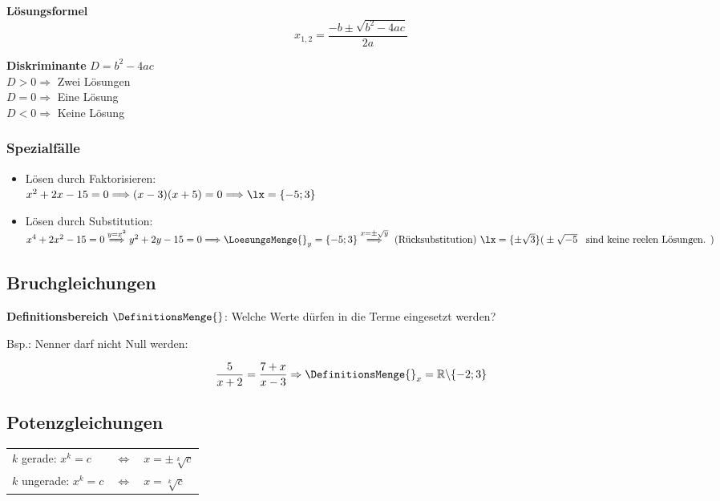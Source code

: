 \begin{multicols}{2}
\begin{tcolorbox}[colback=white]
  \textbf{Lösungsformel}
  $$x_{1,2} = \frac{-b \pm \sqrt{b^2-4ac}}{2a}$$
\end{tcolorbox}
\textbf{Diskriminante} $D = b^2-4ac$\\
$D>0\Longrightarrow$ Zwei Lösungen\\
$D=0\Longrightarrow$ Eine Lösung\\
$D<0\Longrightarrow$ Keine Lösung

\subsubsection*{Spezialfälle}
\begin{itemize}
\item Lösen durch Faktorisieren:\\
$x^2+2x-15=0 \Longrightarrow (x-3)(x+5)=0 \Longrightarrow \lx=\{-5; 3\}$ %

\item Lösen durch Substitution:\\
$x^4+2x^2-15=0 \stackrel{y=x^2}{\Longrightarrow}\\
y^2+2y-15=0 \Longrightarrow \LoesungsMenge{}_y=\{-5;3\} \stackrel{x=\pm{}\sqrt{y}}{\Longrightarrow}
\textrm{ (Rücksubstitution) } \lx=\{\pm\sqrt{3}\}\\
\textrm{(} \pm\sqrt{-5} \textrm{ \, sind keine reelen Lösungen. )}$

\end{itemize}

\subsection*{Bruchgleichungen}

\textbf{Definitionsbereich} $\DefinitionsMenge{}$: Welche Werte dürfen in die Terme eingesetzt werden?

Bsp.: Nenner darf nicht Null werden:

$$\frac5{x+2}=\frac{7+x}{x-3} \Rightarrow{} \DefinitionsMenge{}_x=\mathbb{R}\backslash{}\{-2; 3\}$$

\subsection*{Potenzgleichungen}


\begin{tabular}{lcl}
$k$ gerade:   $x^k=c$ & $\Leftrightarrow$ & $x=\pm\sqrt[k]{c}$\\
$k$ ungerade: $x^k=c$ & $\Leftrightarrow$ & $x=\sqrt[k]{c}$\\
\end{tabular}


\end{multicols}
